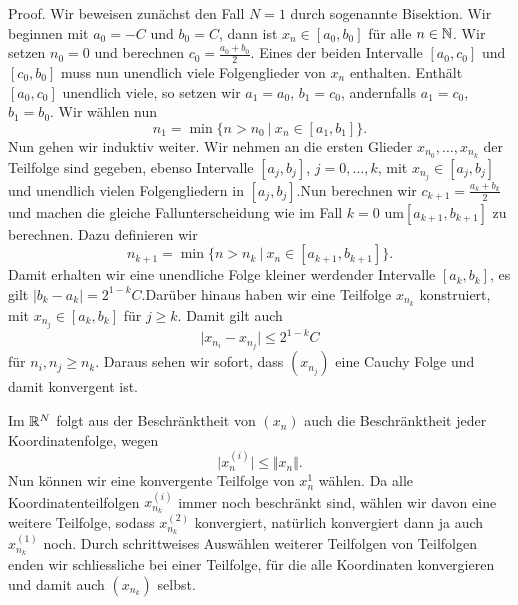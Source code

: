 \begin{emphBox}{}{}
Proof.  Wir beweisen zunächst den Fall \(N=1\) durch sogenannte Bisektion. Wir beginnen mit \(a_0=-C\) und \(b_0=C\), dann ist \(x_n \in [a_0,b_0]\) für alle \(n \in \mathbb{N}\). Wir setzen \(n_0 =0\) und berechnen \(c_0=\frac{a_0+b_0}2\). Eines der beiden Intervalle \([a_0,c_0]\) und \([c_0,b_0]\) muss nun unendlich viele Folgenglieder von \(x_n\) enthalten. Enthält \([a_0,c_0]\) unendlich viele, so setzen wir \(a_1=a_0\), \(b_1=c_0\), andernfalls \(a_1=c_0\), \(b_1=b_0\). Wir wählen nun
\begin{equation*}
 n_1 = \min\{n > n_0~|~x_n \in [a_1,b_1] \}.
\end{equation*}
Nun gehen wir induktiv weiter.
Wir nehmen an die ersten Glieder \(x_{n_0},\ldots,x_{n_k}\) der Teilfolge sind gegeben, ebenso Intervalle \([a_j,b_j]\), \(j=0,\ldots,k\),  mit \(x_{n_j} \in [a_j,b_j]\) und unendlich vielen Folgengliedern in \( [a_j,b_j]\).Nun berechnen wir \(c_{k+1}= \frac{a_k + b_k}2\) und machen die gleiche Fallunterscheidung wie im Fall \(k=0\) um\([a_{k+1},b_{k+1}]\) zu berechnen. Dazu definieren wir
\begin{equation*}
 n_{k+1} = \min\{n > n_k~|~x_n \in [a_{k+1},b_{k+1}] \}.
\end{equation*}
Damit erhalten wir eine unendliche Folge kleiner werdender Intervalle \([a_k,b_k]\), es gilt \(|b_k - a_k|=2^{1-k}C\).Darüber hinaus haben wir eine Teilfolge \(x_{n_k}\) konstruiert, mit \(x_{n_j} \in [a_k,b_k]\) für \(j \geq k\). Damit gilt auch
\begin{equation*}
 \vert x_{n_i} - x_{n_j} \vert \leq 2^{1-k} C
\end{equation*}
für \(n_i, n_j \geq n_k. \) Daraus sehen wir sofort, dass \((x_{n_j})\) eine Cauchy Folge und damit konvergent ist.

Im \(\mathbb{R}^N\) folgt aus der Beschränktheit von \((x_n)\) auch die Beschränktheit jeder Koordinatenfolge, wegen
\begin{equation*}
 \vert x_n^{(i)} \vert \leq \Vert x_n \Vert .
\end{equation*}
Nun können wir eine konvergente Teilfolge von \(x_n^{1}\) wählen. Da alle Koordinatenteilfolgen \(x_{n_k}^{(i)}\) immer noch beschränkt sind, wählen wir davon eine weitere Teilfolge, sodass \(x_{n_k}^{(2)}\) konvergiert, natürlich konvergiert dann ja auch \(x_{n_k}^{(1)}\) noch. Durch schrittweises Auswählen weiterer Teilfolgen von Teilfolgen enden wir schliessliche bei einer Teilfolge, für die alle Koordinaten konvergieren und damit auch \((x_{n_k})\) selbst.
\end{emphBox}

